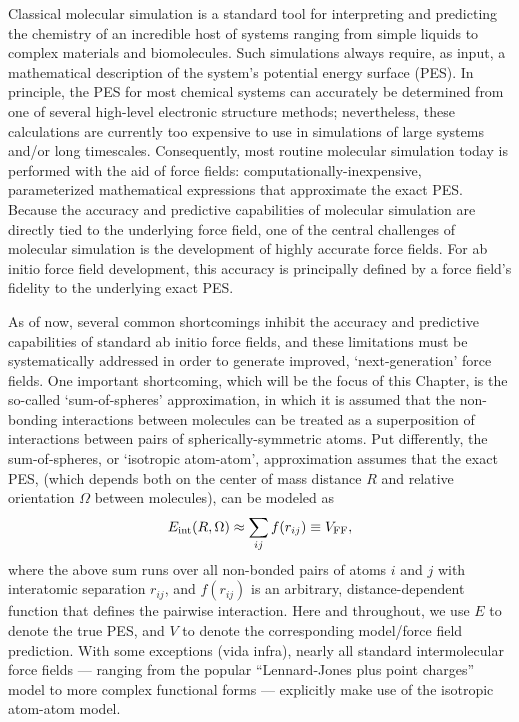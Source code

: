 Classical molecular simulation is a standard tool for
interpreting and predicting the chemistry of an incredible host of systems ranging
from simple liquids to complex materials and biomolecules. Such simulations
always require, as input, a mathematical description of the
system's potential energy surface (PES). In principle, the
PES for most chemical systems can accurately be determined 
from one of several high-level electronic structure methods;
\cite{Rezac2016,Chalasinski2000,Jan2016}
nevertheless, these calculations are currently too expensive to use
in simulations of large systems and/or long timescales. 
\cite{Hassanali2014}
Consequently, most routine
molecular simulation today is performed with the aid of force fields:
computationally-inexpensive, parameterized mathematical expressions that
approximate the exact PES. Because the accuracy and predictive capabilities of
molecular simulation are directly tied to the underlying force
field, one of the central challenges of molecular
simulation is the development of highly accurate force fields. For ab initio
force field development, this accuracy is 
principally defined by a force field's fidelity to the underlying exact PES. 

As of now, several common
shortcomings\cite{Zgarbova2010} inhibit the accuracy and predictive capabilities of
standard ab initio force fields, and these limitations must be systematically addressed
in order to generate improved, `next-generation' force fields. One important
shortcoming, which will be the focus of this Chapter, is the so-called
`sum-of-spheres' approximation,\cite{Stone1988} in which it is assumed that the
non-bonding interactions between molecules can be treated as a superposition
of interactions between pairs of spherically-symmetric atoms.
Put differently, the sum-of-spheres, or `isotropic atom-atom', approximation assumes that the 
exact PES, \etot (which depends
both on the center of mass distance $R$ and relative orientation $\Omega$ between molecules),
can be modeled as
\begin{align}
\label{eq:sos_approx}
E_{\text{int}}(R,\Omega) \approx \sum\limits_{ij} f(r_{ij}) \equiv V_{\text{FF}},
\end{align}
where the above sum runs over all
non-bonded pairs of atoms $i$ and $j$ with interatomic separation $r_{ij}$,
and $f(r_{ij})$ is an arbitrary, distance-dependent function that defines the pairwise
interaction.
Here and throughout, we use $E$ to denote the true PES, and $V$ to denote the
corresponding model/force field prediction. 
With some exceptions (vida infra), nearly all standard intermolecular force
fields ---
ranging from the popular ``Lennard-Jones plus point charges'' model to more complex
functional forms\cite{Schmidt2015}
---
explicitly make use of the isotropic atom-atom model.

